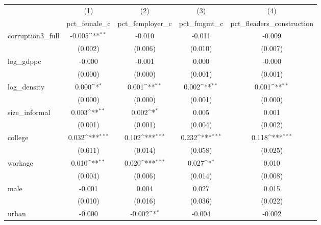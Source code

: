 {
\def\sym#1{\ifmmode^{#1}\else\(^{#1}\)\fi}
\begin{tabular}{l*{4}{c}}
\hline\hline
            &\multicolumn{1}{c}{(1)}&\multicolumn{1}{c}{(2)}&\multicolumn{1}{c}{(3)}&\multicolumn{1}{c}{(4)}\\
            &\multicolumn{1}{c}{pct\_female\_c}&\multicolumn{1}{c}{pct\_femployer\_c}&\multicolumn{1}{c}{pct\_fmgmt\_c}&\multicolumn{1}{c}{pct\_fleaders\_construction}\\
\hline
corruption3\_full&      -0.005\sym{**} &      -0.010         &      -0.011         &      -0.009         \\
            &     (0.002)         &     (0.006)         &     (0.010)         &     (0.007)         \\
[1em]
log\_gdppc   &      -0.000         &      -0.001         &       0.000         &      -0.000         \\
            &     (0.000)         &     (0.000)         &     (0.001)         &     (0.001)         \\
[1em]
log\_density &       0.000\sym{*}  &       0.001\sym{**} &       0.002\sym{**} &       0.001\sym{**} \\
            &     (0.000)         &     (0.000)         &     (0.001)         &     (0.000)         \\
[1em]
size\_informal&       0.003\sym{**} &       0.002\sym{*}  &       0.005         &       0.001         \\
            &     (0.001)         &     (0.001)         &     (0.004)         &     (0.002)         \\
[1em]
college     &       0.032\sym{***}&       0.102\sym{***}&       0.232\sym{***}&       0.118\sym{***}\\
            &     (0.011)         &     (0.014)         &     (0.058)         &     (0.025)         \\
[1em]
workage     &       0.010\sym{**} &       0.020\sym{***}&       0.027\sym{*}  &       0.010         \\
            &     (0.004)         &     (0.006)         &     (0.014)         &     (0.008)         \\
[1em]
male        &      -0.001         &       0.004         &       0.027         &       0.015         \\
            &     (0.010)         &     (0.016)         &     (0.036)         &     (0.022)         \\
[1em]
urban       &      -0.000         &      -0.002\sym{*}  &      -0.004         &      -0.002         \\

\end{tabular}}
